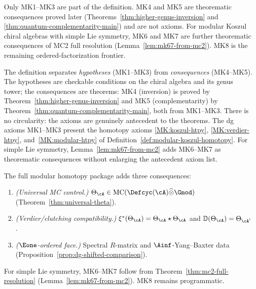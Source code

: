 \begin{remark}\label{rem:mk-axioms-vs-consequences}
Only MK1--MK3 are part of the definition. MK4 and MK5 are theorematic
consequences proved later (Theorems~\ref{thm:higher-genus-inversion} and
\ref{thm:quantum-complementarity-main}) and are not axioms.  For
modular Koszul chiral algebras with simple Lie symmetry, MK6 and MK7
are further theorematic consequences of MC2 full resolution
(Lemma~\ref{lem:mk67-from-mc2}).  MK8 is the remaining
ordered-factorization frontier.
\end{remark}

\begin{remark}\label{rem:mk-axiom-relations}
The definition separates \emph{hypotheses} (MK1--MK3) from
\emph{consequences} (MK4--MK5).  The hypotheses are
checkable conditions on the chiral algebra and its genus tower;
the consequences are theorems: MK4 (inversion) is proved by Theorem~\ref{thm:higher-genus-inversion} and MK5 (complementarity) by Theorem~\ref{thm:quantum-complementarity-main}, both from MK1--MK3.
There is no circularity: the axioms are genuinely antecedent
to the theorems.  The dg axioms MK1--MK3 present the homotopy axioms
\ref{MK:koszul-htpy}, \ref{MK:verdier-htpy},
and~\ref{MK:modular-htpy} of
Definition~\ref{def:modular-koszul-homotopy}.  For simple Lie
symmetry, Lemma~\ref{lem:mk67-from-mc2} adds MK6--MK7 as theorematic
consequences without enlarging the antecedent axiom list.
\end{remark}

\begin{remark}
\label{rem:extended-axiom-schema}
The full modular homotopy package adds three consequences:
\begin{enumerate}[label=\textup{(MK\arabic*)},start=6]
\item\label{MK:mc-control}
\emph{(Universal MC control.)}
$\Theta_{\cA}\in\operatorname{MC}(\Defcyc(\cA)\widehat{\otimes}\Gmod)$
(Theorem~\ref{thm:universal-theta}).
\item\label{MK:clutching-verdier}
\emph{(Verdier/clutching compatibility.)}
$\xi^*(\Theta_{\cA})=\Theta_{\cA}\star\Theta_{\cA}$ and
$\mathbb{D}(\Theta_{\cA})=\Theta_{\cA^!}$.
\item\label{MK:e1-face}
\emph{($\Eone$-ordered face.)} Spectral $R$-matrix and
$\Ainf$-Yang--Baxter data
(Proposition~\ref{prop:dg-shifted-comparison}).
\end{enumerate}
For simple Lie symmetry, MK6--MK7 follow from
Theorem~\ref{thm:mc2-full-resolution}
(Lemma~\ref{lem:mk67-from-mc2}).  MK8 remains programmatic.
\end{remark}

